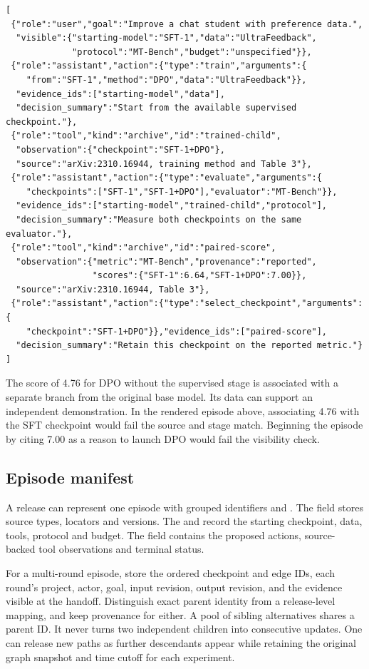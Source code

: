 \begin{verbatim}
[
 {"role":"user","goal":"Improve a chat student with preference data.",
  "visible":{"starting-model":"SFT-1","data":"UltraFeedback",
             "protocol":"MT-Bench","budget":"unspecified"}},
 {"role":"assistant","action":{"type":"train","arguments":{
    "from":"SFT-1","method":"DPO","data":"UltraFeedback"}},
  "evidence_ids":["starting-model","data"],
  "decision_summary":"Start from the available supervised checkpoint."},
 {"role":"tool","kind":"archive","id":"trained-child",
  "observation":{"checkpoint":"SFT-1+DPO"},
  "source":"arXiv:2310.16944, training method and Table 3"},
 {"role":"assistant","action":{"type":"evaluate","arguments":{
    "checkpoints":["SFT-1","SFT-1+DPO"],"evaluator":"MT-Bench"}},
  "evidence_ids":["starting-model","trained-child","protocol"],
  "decision_summary":"Measure both checkpoints on the same evaluator."},
 {"role":"tool","kind":"archive","id":"paired-score",
  "observation":{"metric":"MT-Bench","provenance":"reported",
                 "scores":{"SFT-1":6.64,"SFT-1+DPO":7.00}},
  "source":"arXiv:2310.16944, Table 3"},
 {"role":"assistant","action":{"type":"select_checkpoint","arguments":{
    "checkpoint":"SFT-1+DPO"}},"evidence_ids":["paired-score"],
  "decision_summary":"Retain this checkpoint on the reported metric."}
]
\end{verbatim}

The score of 4.76 for DPO without the supervised stage is associated with a separate branch from the original base model. Its data can support an independent demonstration. In the rendered episode above, associating 4.76 with the SFT checkpoint would fail the source and stage match. Beginning the episode by citing 7.00 as a reason to launch DPO would fail the visibility check.

\subsection{Episode manifest}

A release can represent one episode with grouped identifiers  and . The  field stores source types, locators and versions. The  and  record the starting checkpoint, data, tools, protocol and budget. The  field contains the proposed actions, source-backed tool observations and terminal status.

For a multi-round episode, store the ordered checkpoint and edge IDs, each round's project, actor, goal, input revision, output revision, and the evidence visible at the handoff. Distinguish exact parent identity from a release-level mapping, and keep provenance for either. A pool of sibling alternatives shares a parent ID. It never turns two independent children into consecutive updates. One can release new paths as further descendants appear while retaining the original graph snapshot and time cutoff for each experiment.


